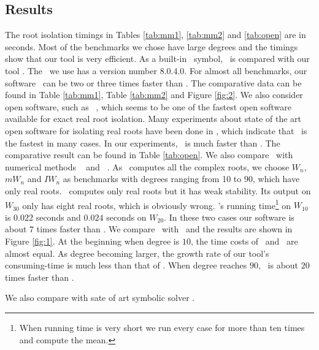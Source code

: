  \subsection{Results}
 The root isolation timings in Tables \ref{tab:mm1}, \ref{tab:mm2} and \ref{tab:open} are in seconds.  Most of the benchmarks we chose have large degrees and the timings show that our tool is very efficient.
As a  built-in \MM\ symbol, \inte\ is    compared with  our tool \froot. The  \MM\  we use has a version number 8.0.4.0. For  almost all
 benchmarks, our  software \froot\  can be  two or three times faster than \inte. The comparative data can be found in Table \ref{tab:mm1}, Table  \ref{tab:mm2} and Figure \ref{fig:2}.
 We also consider open software,  such as \cf\  \cite{hemmer09}, which
 seems to be one of the fastest  open software  available for exact real root isolation. Many experiments  about  state of the art open software for isolating
 real roots have been done in \cite{hemmer09},  which  indicate that     \cf\  is the fastest in many cases.
 In our experiments, \froot\ is much faster than \cf. %
 The comparative result can be found in
 Table \ref{tab:open}. We also compare \froot\  with numerical methods  \eign\ \cite{eigsolev} and \sle\ \cite{hemmer09}. As \eign\ computes all the complex roots, we choose $W_n$, $mW_n$ and $IW_n$ as benchmarks with degrees ranging from 10 to 90, which have only real roots. \sle\ computes only real roots but it has weak stability. Its output on $W_{30}$ only has eight real roots, which is obviously wrong. \sle's running time\footnote{When  running time is very short we run every case for more than ten times and compute the mean.} on $W_{10}$ is $0.022$ seconds and
 $0.024$ seconds on $W_{20}$. In these two cases our software is about $7$ times faster than \sle. We compare \froot\ with  \eign\ and the results are  shown in Figure \ref{fig:1}.
 At the beginning when degree is $10$, the time costs of \froot\ and \eign\ are
 almost equal. As degree becoming larger, the growth rate of our tool's consuming-time is much less than that of  \eign.  When degree reaches $90$, \froot\ is about $20$ times faster than \eign.


{\color{red} We also compare  \froot} with sate of art symbolic solver \AND\cite{Tsigaridas2016}.

